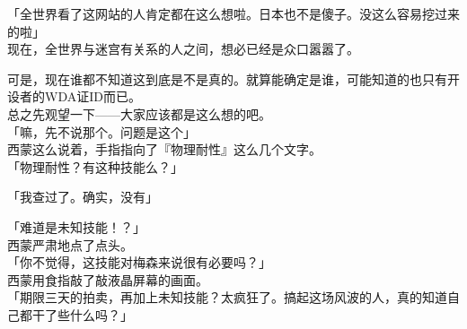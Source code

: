 「全世界看了这网站的人肯定都在这么想啦。日本也不是傻子。没这么容易挖过来的啦」\\

现在，全世界与迷宫有关系的人之间，想必已经是众口嚣嚣了。

可是，现在谁都不知道这到底是不是真的。就算能确定是谁，可能知道的也只有开设者的WDA证ID而已。\\

总之先观望一下——大家应该都是这么想的吧。\\

「嘛，先不说那个。问题是这个」\\

西蒙这么说着，手指指向了『物理耐性』这么几个文字。\\

「物理耐性？有这种技能么？」

「我查过了。确实，没有」

「难道是未知技能！？」\\

西蒙严肃地点了点头。\\

「你不觉得，这技能对梅森来说很有必要吗？」\\

西蒙用食指敲了敲液晶屏幕的画面。\\

「期限三天的拍卖，再加上未知技能？太疯狂了。搞起这场风波的人，真的知道自己都干了些什么吗？」

